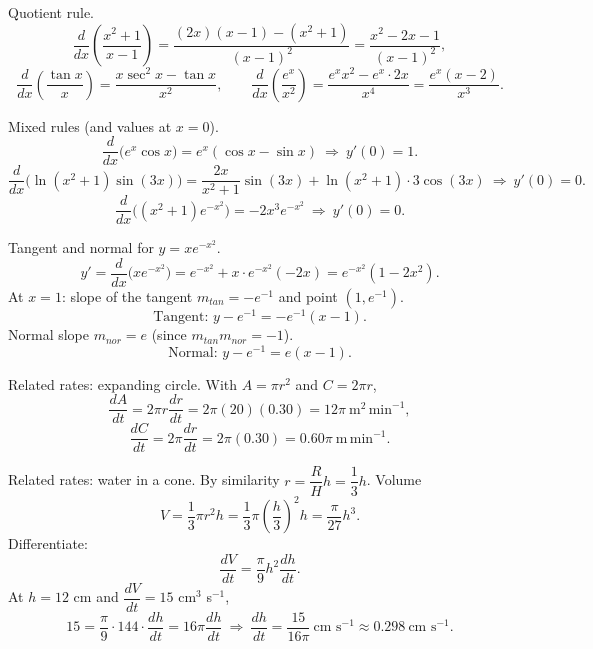 \documentclass[11pt]{article}
\def\textbf#1{#1}%
\def\mathrm#1{#1}%
\begin{document}
\begin{solution}
\textbf{Quotient rule.}
\[
\frac{d}{dx}\!\left(\frac{x^{2}+1}{x-1}\right)
=\frac{(2x)(x-1)-(x^{2}+1)}{(x-1)^{2}}
=\frac{x^{2}-2x-1}{(x-1)^{2}},
\]
\[
\frac{d}{dx}\!\left(\frac{\tan x}{x}\right)=\frac{x\sec^{2}x-\tan x}{x^{2}},
\qquad
\frac{d}{dx}\!\left(\frac{e^{x}}{x^{2}}\right)
=\frac{e^{x}x^{2}-e^{x}\cdot 2x}{x^{4}}
=\frac{e^{x}(x-2)}{x^{3}}.
\]
\end{solution}

\begin{solution}
\textbf{Mixed rules (and values at $x=0$).}
\[
\frac{d}{dx}\big(e^{x}\cos x\big)=e^{x}(\cos x-\sin x)\ \Rightarrow\ y'(0)=1.
\]
\[
\frac{d}{dx}\big(\ln(x^{2}+1)\sin(3x)\big)=\frac{2x}{x^{2}+1}\sin(3x)+\ln(x^{2}+1)\cdot 3\cos(3x)\ \Rightarrow\ y'(0)=0.
\]
\[
\frac{d}{dx}\big((x^{2}+1)e^{-x^{2}}\big)=-2x^{3}e^{-x^{2}}\ \Rightarrow\ y'(0)=0.
\]
\end{solution}

\begin{solution}
\textbf{Tangent and normal for $y=xe^{-x^{2}}$.}
\[
y'=\frac{d}{dx}\big(xe^{-x^{2}}\big)=e^{-x^{2}}+x\cdot e^{-x^{2}}(-2x)=e^{-x^{2}}(1-2x^{2}).
\]
At $x=1$: slope of the tangent $m_{\mathrm{tan}}=-e^{-1}$ and point $(1,e^{-1})$.
\[
\text{Tangent: } y-e^{-1}=-e^{-1}(x-1).
\]
Normal slope $m_{\mathrm{nor}}=e$ (since $m_{\mathrm{tan}}m_{\mathrm{nor}}=-1$).
\[
\text{Normal: } y-e^{-1}=e(x-1).
\]
\end{solution}

\begin{solution}
\textbf{Related rates: expanding circle.} With $A=\pi r^{2}$ and $C=2\pi r$,
\[
\frac{dA}{dt}=2\pi r\frac{dr}{dt}=2\pi(20)(0.30)=12\pi\ \text{m}^{2}\,\text{min}^{-1},
\]
\[
\frac{dC}{dt}=2\pi\frac{dr}{dt}=2\pi(0.30)=0.60\pi\ \text{m}\,\text{min}^{-1}.
\]
\end{solution}

\begin{solution}
\textbf{Related rates: water in a cone.} By similarity $r=\dfrac{R}{H}h=\dfrac{1}{3}h$. Volume
\[
V=\frac{1}{3}\pi r^{2}h=\frac{1}{3}\pi\left(\frac{h}{3}\right)^{2}h=\frac{\pi}{27}h^{3}.
\]
Differentiate:
\[
\frac{dV}{dt}=\frac{\pi}{9}h^{2}\frac{dh}{dt}.
\]
At $h=12$ cm and $\dfrac{dV}{dt}=15$ cm$^{3}$ s$^{-1}$,
\[
15=\frac{\pi}{9}\cdot 144\cdot \frac{dh}{dt}=16\pi\frac{dh}{dt}
\ \Rightarrow\ 
\frac{dh}{dt}=\frac{15}{16\pi}\ \text{cm s}^{-1}\approx 0.298\ \text{cm s}^{-1}.
\]
\end{solution}
\end{document}
